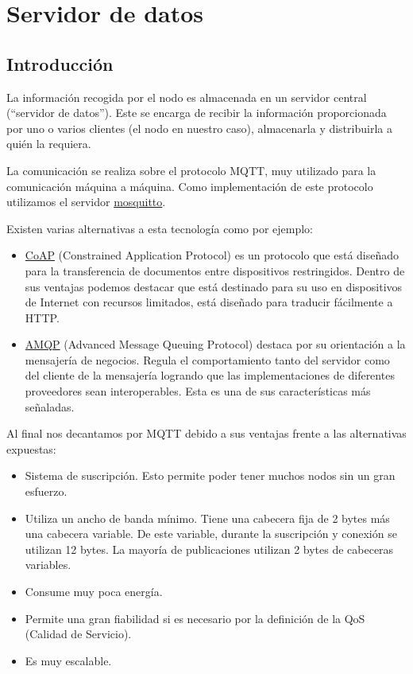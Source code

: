 \cleardoublepage

\chapter{Servidor de datos}
\label{makereference3}

\section{Introducción}
\label{makereference3.1}
La información recogida por el nodo es almacenada en un servidor central (``servidor de datos''). Este se encarga de recibir la información proporcionada por uno o varios clientes (el nodo en nuestro caso), almacenarla y distribuirla a quién la requiera.

La comunicación se realiza sobre el protocolo MQTT, muy utilizado para la comunicación máquina a máquina. Como implementación de este protocolo utilizamos el servidor \href{https://mosquitto.org/}{mosquitto}.

Existen varias alternativas a esta tecnología como por ejemplo:
\begin{itemize}
\item \href{https://en.wikipedia.org/wiki/Constrained_Application_Protocol}{CoAP} (Constrained Application Protocol) es un protocolo que está diseñado para la transferencia de documentos entre dispositivos restringidos. Dentro de sus ventajas podemos destacar que está destinado para su uso en dispositivos de Internet con recursos limitados, está diseñado para traducir fácilmente a HTTP.
\item \href{https://www.amqp.org/}{AMQP} (Advanced Message Queuing Protocol) destaca por su orientación a la mensajería de negocios. Regula el comportamiento tanto del servidor como del cliente de la mensajería logrando que las implementaciones de diferentes proveedores sean interoperables. Esta es una de sus características más señaladas.
\end{itemize}

Al final nos decantamos por MQTT debido a sus ventajas frente a las alternativas expuestas:

\begin{itemize}
\item Sistema de suscripción. Esto permite poder tener muchos nodos sin un gran esfuerzo.
\item Utiliza un ancho de banda mínimo. Tiene una cabecera fija de 2 bytes más una cabecera variable. De este variable, durante la suscripción y conexión se utilizan 12 bytes. La mayoría de publicaciones utilizan 2 bytes de cabeceras variables.
\item Consume muy poca energía.
\item Permite una gran fiabilidad si es necesario por la definición de la QoS (Calidad de Servicio).
\item Es muy escalable.
\end{itemize}


